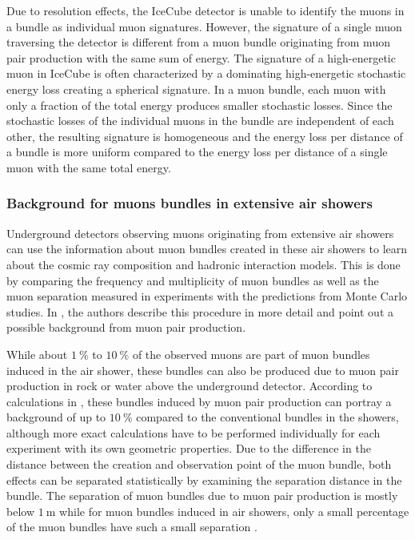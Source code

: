 Due to resolution effects, the IceCube detector is unable to identify the muons in a bundle as individual muon signatures.
However, the signature of a single muon traversing the detector is different from a muon bundle originating from muon pair production with the same sum of energy.
The signature of a high-energetic muon in IceCube is often characterized by a dominating high-energetic stochastic energy loss creating a spherical signature.
In a muon bundle, each muon with only a fraction of the total energy produces smaller stochastic losses.
Since the stochastic losses of the individual muons in the bundle are independent of each other, the resulting signature is homogeneous and the energy loss per distance of a bundle is more uniform compared to the energy loss per distance of a single muon with the same total energy. 

\subsubsection{Background for muons bundles in extensive air showers}

Underground detectors observing muons originating from extensive air showers can use the information about muon bundles created in these air showers to learn about the cosmic ray composition and hadronic interaction models.
This is done by comparing the frequency and multiplicity of muon bundles as well as the muon separation measured in experiments with the predictions from Monte Carlo studies.
In \cite{MupairInRock}, the authors describe this procedure in more detail and point out a possible background from muon pair production.

While about $\SI{1}{\percent}$ to $\SI{10}{\percent}$ of the observed muons are part of muon bundles induced in the air shower, these bundles can also be produced due to muon pair production in rock or water above the underground detector.
According to calculations in \cite{MupairInRock}, these bundles induced by muon pair production can portray a background of up to $\SI{10}{\percent}$ compared to the conventional bundles in the showers, although more exact calculations have to be performed individually for each experiment with its own geometric properties.
Due to the difference in the distance between the creation and observation point of the muon bundle, both effects can be separated statistically by examining the separation distance in the bundle.
The separation of muon bundles due to muon pair production is mostly below $\SI{1}{\metre}$ while for muon bundles induced in air showers, only a small percentage of the muon bundles have such a small separation \cite{MupairInRock}.

